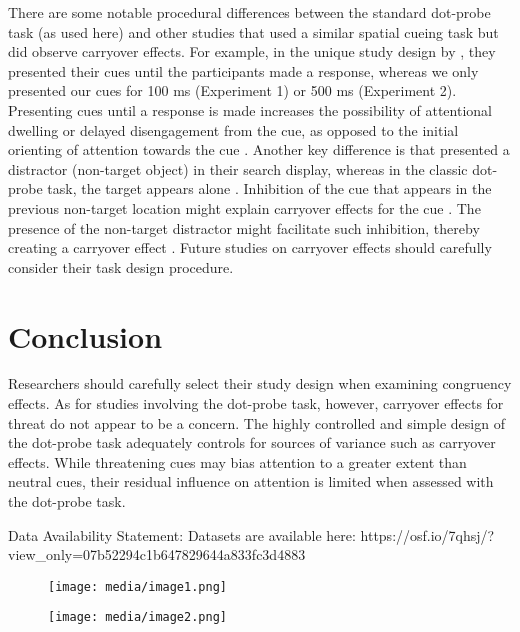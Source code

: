 \documentclass{article}
\begin{document}
There are some notable procedural differences between the standard dot-probe task (as used here) and other studies that used a similar spatial cueing task but did observe carryover effects. For example, in the unique study design by \parencite{Gladwin2019a, Gladwin2020a}, they presented their cues until the participants made a response, whereas we only presented our cues for 100 ms (Experiment 1) or 500 ms (Experiment 2). Presenting cues until a response is made increases the possibility of attentional dwelling or delayed disengagement from the cue, as opposed to the initial orienting of attention towards the cue \parencite{Fox2001}. Another key difference is that \parencite{Gladwin2019a, Gladwin2020a} presented a distractor (non-target object) in their search display, whereas in the classic dot-probe task, the target appears alone \parencite{Mogg1998}. Inhibition of the cue that appears in the previous non-target location might explain carryover effects for the cue \parencite{Gladwin2020a}. The presence of the non-target distractor might facilitate such inhibition, thereby creating a carryover effect \parencite{Gillich2019, Gladwin2019a}. Future studies on carryover effects should carefully consider their task design procedure. 

\section{Conclusion}

Researchers should carefully select their study design when examining congruency effects. As for studies involving the dot-probe task, however, carryover effects for threat do not appear to be a concern. The highly controlled and simple design of the dot-probe task adequately controls for sources of variance such as carryover effects. While threatening cues may bias attention to a greater extent than neutral cues, their residual influence on attention is limited when assessed with the dot-probe task. 

Data Availability Statement:\emph{ }Datasets are available here: https://osf.io/7qhsj/?view\_only=07b52294c1b647829644a833fc3d4883 




\begin{figure}

  \texttt{[image: media/image1.png]}
\caption{}
\label{}


\end{figure}

\begin{figure}

  \texttt{[image: media/image2.png]}
\caption{}
\label{}


\end{figure}
\end{document}
